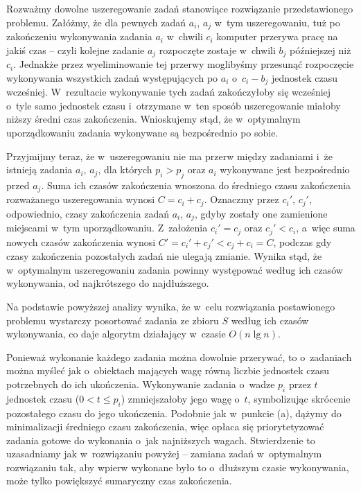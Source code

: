
\subproblem %
Rozważmy dowolne uszeregowanie zadań stanowiące rozwiązanie przedstawionego problemu.
Załóżmy, że dla pewnych zadań $a_i$, $a_j$ w~tym uszeregowaniu, tuż po zakończeniu wykonywania zadania $a_i$ w~chwili $c_i$ komputer przerywa pracę na jakiś czas -- czyli kolejne zadanie $a_j$ rozpoczęte zostaje w~chwili $b_j$ późniejszej niż $c_i$.
Jednakże przez wyeliminowanie tej przerwy moglibyśmy przesunąć rozpoczęcie wykonywania wszystkich zadań występujących po $a_i$ o~$c_i-b_j$ jednostek czasu wcześniej.
W~rezultacie wykonywanie tych zadań zakończyłoby się wcześniej o~tyle samo jednostek czasu i~otrzymane w~ten sposób uszeregowanie miałoby niższy średni czas zakończenia.
Wnioskujemy stąd, że w~optymalnym uporządkowaniu zadania wykonywane są bezpośrednio po sobie.

Przyjmijmy teraz, że w~uszeregowaniu nie ma przerw między zadaniami i~że istnieją zadania $a_i$, $a_j$, dla których $p_i>p_j$ oraz $a_i$ wykonywane jest bezpośrednio przed $a_j$.
Suma ich czasów zakończenia wnoszona do średniego czasu zakończenia rozważanego uszeregowania wynosi $C=c_i+c_j$.
Oznaczmy przez $c_i'$, $c_j'$, odpowiednio, czasy zakończenia zadań $a_i$, $a_j$, gdyby zostały one zamienione miejscami w~tym uporządkowaniu.
Z~założenia $c_i'=c_j$ oraz $c_j'<c_i$, a~więc suma nowych czasów zakończenia wynosi $C'=c_i'+c_j'<c_j+c_i=C$, podczas gdy czasy zakończenia pozostałych zadań nie ulegają zmianie.
Wynika stąd, że w~optymalnym uszeregowaniu zadania powinny występować według ich czasów wykonywania, od najkrótszego do najdłuższego.

Na podstawie powyższej analizy wynika, że w~celu rozwiązania postawionego problemu wystarczy posortować zadania ze zbioru $S$ według ich czasów wykonywania, co daje algorytm działający w~czasie $O(n\lg n)$.

\subproblem %
Ponieważ wykonanie każdego zadania można dowolnie przerywać, to o~zadaniach można myśleć jak o~obiektach mających wagę równą liczbie jednostek czasu potrzebnych do ich ukończenia.
Wykonywanie zadania o~wadze $p_i$ przez $t$ jednostek czasu ($0<t\le p_i$) zmniejszałoby jego wagę o~$t$, symbolizując skrócenie pozostałego czasu do jego ukończenia.
Podobnie jak w~punkcie (a), dążymy do minimalizacji średniego czasu zakończenia, więc opłaca się priorytetyzować zadania gotowe do wykonania o~jak najniższych wagach.
Stwierdzenie to uzasadniamy jak w~rozwiązaniu powyżej -- zamiana zadań w~optymalnym rozwiązaniu tak, aby wpierw wykonane było to o~dłuższym czasie wykonywania, może tylko powiększyć sumaryczny czas zakończenia.

